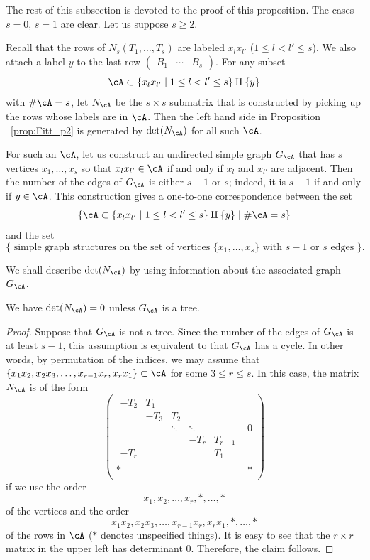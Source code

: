 The rest of this subsection is devoted to the proof of this proposition.
The cases $s = 0$, $s = 1$ are clear.
Let us suppose $s \geq 2$.

Recall that the rows of $N_s(T_1, \dots, T_s)$ are labeled $x_l x_{l'}$ ($1 \leq l < l' \leq s$).
We also attach a label $y$ to the last row $\begin{pmatrix} B_1 & \cdots & B_s \end{pmatrix}$.
For any subset 
\[
\cA \subset \{x_l x_{l'} \mid 1 \leq l < l' \leq s\} \amalg \{y\}
\]
with $\# \cA = s$, let $N_{\cA}$ be the $s \times s$ submatrix that is constructed by picking up the rows whose labels are in $\cA$.
Then the left hand side in Proposition ~\ref{prop:Fitt_p2} is generated by $\det(N_{\cA})$ for all such $\cA$.

For such an $\cA$, let us construct an undirected simple graph $G_{\cA}$ that has $s$ vertices $x_1, \dots, x_s$ so that $x_l x_{l'} \in \cA$ if and only if $x_l$ and $x_{l'}$ are adjacent.
Then the number of the edges of $G_{\cA}$ is either $s-1$ or $s$; indeed, it is $s-1$ if and only if $y \in \cA$.
This construction gives a one-to-one correspondence between the set
\[
\{ \cA \subset \{x_l x_{l'} \mid 1 \leq l < l' \leq s\} \amalg \{y\} \mid \# \cA = s\}
\]
and the set
\[
\{ \text{ simple graph structures on the set of vertices $\{x_1, \dots, x_s\}$ with $s-1$ or $s$ edges }\}.
\]

We shall describe $\det(N_{\cA})$ by using information about the associated graph $G_{\cA}$.

\begin{claim}\label{claim2}
We have $\det(N_{\cA}) = 0$ unless $G_{\cA}$ is a tree.
\end{claim}

\begin{proof}
Suppose that $G_{\cA}$ is not a tree.
Since the number of the edges of $G_{\cA}$ is at least $s-1$, this assumption is equivalent to that $G_{\cA}$ has a cycle.
In other words, by permutation of the indices, we may assume that $\{x_1x_2, x_2 x_3, \dots, x_{r-1} x_r, x_r x_1\} \subset \cA$ for some $3 \leq r \leq s$.
In this case, the matrix $N_{\cA}$ is of the form
\[
\begin{pmatrix}
	\begin{matrix}
		-T_2 & T_1 & & & \\
		& -T_3 & T_2 & & \\
		& & \ddots & \ddots & \\
		& & & - T_r & T_{r-1}\\
		-T_r & & & & T_1
	\end{matrix}
 & 0\\
* & * \\
\end{pmatrix}
\]
if we use the order
\[
x_1, x_2, \dots, x_r, *, \dots, *
\]
of the vertices and the order 
\[
x_1x_2, x_2 x_3, \dots, x_{r-1} x_r, x_r x_1, *, \dots, *
\]
 of the rows in $\cA$ ($*$ denotes unspecified things).
It is easy to see that the $r \times r$ matrix in the upper left has determinant $0$.
Therefore, the claim follows.
\end{proof}

